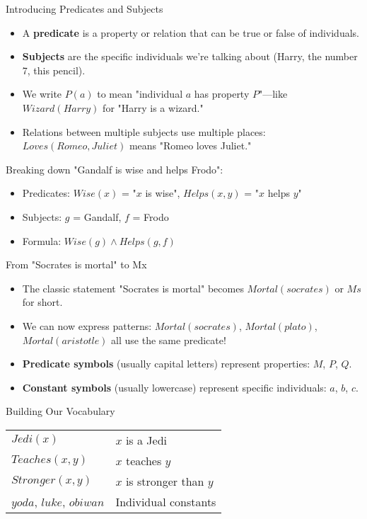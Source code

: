 \documentclass{beamer}
\begin{document}
	\begin{frame}{Introducing Predicates and Subjects}
		\begin{itemize}
			\item A \textbf{predicate} is a property or relation that can be true or false of individuals.
			\item \textbf{Subjects} are the specific individuals we're talking about (Harry, the number 7, this pencil).
			\item We write $P(a)$ to mean "individual $a$ has property $P$"—like $Wizard(Harry)$ for "Harry is a wizard."
			\item Relations between multiple subjects use multiple places: $Loves(Romeo, Juliet)$ means "Romeo loves Juliet."
		\end{itemize}
		
		\begin{example}
			Breaking down "Gandalf is wise and helps Frodo":
			\begin{itemize}
				\item Predicates: $Wise(x)$ = "$x$ is wise", $Helps(x,y)$ = "$x$ helps $y$"
				\item Subjects: $g$ = Gandalf, $f$ = Frodo
				\item Formula: $Wise(g) \wedge Helps(g,f)$
			\end{itemize}
		\end{example}
	\end{frame}
	
	\begin{frame}{From "Socrates is mortal" to Mx}
		\begin{itemize}
			\item The classic statement "Socrates is mortal" becomes $Mortal(socrates)$ or $Ms$ for short.
			\item We can now express patterns: $Mortal(socrates)$, $Mortal(plato)$, $Mortal(aristotle)$ all use the same predicate!
			\item \textbf{Predicate symbols} (usually capital letters) represent properties: $M$, $P$, $Q$.
			\item \textbf{Constant symbols} (usually lowercase) represent specific individuals: $a$, $b$, $c$.
		\end{itemize}
		
		\begin{block}{Building Our Vocabulary}
			\begin{tabular}{ll}
				$Jedi(x)$ & $x$ is a Jedi \\
				$Teaches(x,y)$ & $x$ teaches $y$ \\
				$Stronger(x,y)$ & $x$ is stronger than $y$ \\
				$yoda$, $luke$, $obiwan$ & Individual constants
			\end{tabular}
		\end{block}
	\end{frame}
	
\end{document}
